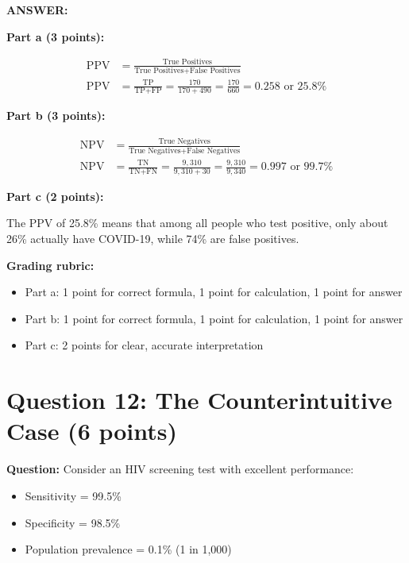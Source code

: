 \documentclass[11pt]{article}
\begin{document}
\textbf{ANSWER:}

\textbf{Part a (3 points):}

\begin{align*}
\text{PPV} &= \frac{\text{True Positives}}{\text{True Positives} + \text{False Positives}}\\
\text{PPV} &= \frac{\text{TP}}{\text{TP} + \text{FP}} = \frac{170}{170 + 490} = \frac{170}{660} = 0.258 \text{ or } 25.8\%
\end{align*}

\textbf{Part b (3 points):}

\begin{align*}
\text{NPV} &= \frac{\text{True Negatives}}{\text{True Negatives} + \text{False Negatives}}\\
\text{NPV} &= \frac{\text{TN}}{\text{TN} + \text{FN}} = \frac{9{,}310}{9{,}310 + 30} = \frac{9{,}310}{9{,}340} = 0.997 \text{ or } 99.7\%
\end{align*}

\textbf{Part c (2 points):}

The PPV of 25.8\% means that among all people who test positive, only about 26\% actually have COVID-19, while 74\% are false positives.

\textbf{Grading rubric:}
\begin{itemize}
    \item Part a: 1 point for correct formula, 1 point for calculation, 1 point for answer
    \item Part b: 1 point for correct formula, 1 point for calculation, 1 point for answer
    \item Part c: 2 points for clear, accurate interpretation
\end{itemize}

\vspace{0.3cm}
\noindent\hrulefill

\section*{Question 12: The Counterintuitive Case (6 points)}

\textbf{Question:} Consider an HIV screening test with excellent performance:
\begin{itemize}
    \item Sensitivity = 99.5\%
    \item Specificity = 98.5\%
    \item Population prevalence = 0.1\% (1 in 1,000)
\end{itemize}
\end{document}
